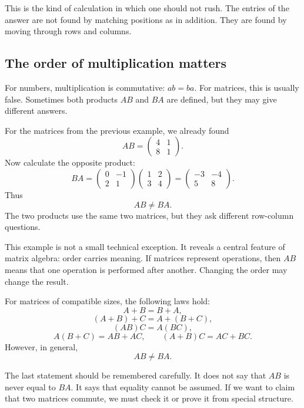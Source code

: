 This is the kind of calculation in which one should not rush. The entries of the answer are not found by matching positions as in addition. They are found by moving through rows and columns.

\subsection{The order of multiplication matters}

For numbers, multiplication is commutative: \(ab=ba\). For matrices, this is usually false. Sometimes both products \(AB\) and \(BA\) are defined, but they may give different answers.

\begin{examplebox}
For the matrices from the previous example, we already found
\[
AB=
\begin{pmatrix}
4 & 1\\
8 & 1
\end{pmatrix}.
\]
Now calculate the opposite product:
\[
BA=
\begin{pmatrix}0 & -1\\ 2 & 1\end{pmatrix}
\begin{pmatrix}1 & 2\\ 3 & 4\end{pmatrix}
=
\begin{pmatrix}
-3 & -4\\
5 & 8
\end{pmatrix}.
\]
Thus
\[
AB\ne BA.
\]
The two products use the same two matrices, but they ask different row-column questions.
\end{examplebox}

This example is not a small technical exception. It reveals a central feature of matrix algebra: order carries meaning. If matrices represent operations, then \(AB\) means that one operation is performed after another. Changing the order may change the result.

\begin{theorembox}
For matrices of compatible sizes, the following laws hold:
\[
A+B=B+A,
\]
\[
(A+B)+C=A+(B+C),
\]
\[
(AB)C=A(BC),
\]
\[
A(B+C)=AB+AC,
\qquad
(A+B)C=AC+BC.
\]
However, in general,
\[
AB\ne BA.
\]
\end{theorembox}

The last statement should be remembered carefully. It does not say that \(AB\) is never equal to \(BA\). It says that equality cannot be assumed. If we want to claim that two matrices commute, we must check it or prove it from special structure.

